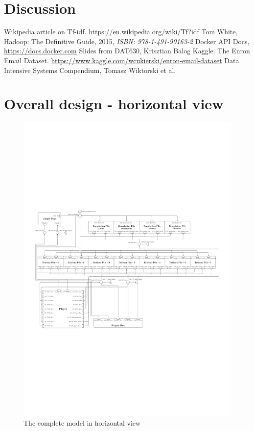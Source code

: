 \documentclass[runningheads,a4paper]{llncs}
\begin{document}
\section{Discussion}



\begin{thebibliography}{6}

 Wikipedia article on Tf-idf. \url{https://en.wikipedia.org/wiki/Tf?idf}
 Tom White, Hadoop: The Definitive Guide, 2015, \emph{ISBN: 978-1-491-90163-2}
 Docker API Docs, \url{https://docs.docker.com}
 Slides from DAT630, Krisztian Balog
 Kaggle. The Enron Email Dataset. \url{https://www.kaggle.com/wcukierski/enron-email-dataset}
 Data Intensive Systems Compendium, Tomasz Wiktorski et al.

\end{thebibliography}
\appendix
\section{Overall design - horizontal view}
\begin{figure}
	\includegraphics[trim=40 100 100 310,angle=90,scale=1.4]{images/overallViewPdf}
	\caption{The complete model in horizontal view}
	\label{fig:full_vertical}
\end{figure}
\clearpage
\end{document}
